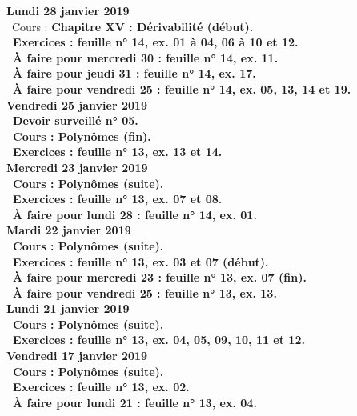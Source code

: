 \documentclass[12pt,a4paper]{article}
\begin{document}
\noindent\textbf{Lundi 28 janvier 2019} \\
\bu\ Cours : \bf Chapitre XV \rm : Dérivabilité (début).\\
\bu\ Exercices : feuille n° 14, ex. 01 à 04, 06 à 10 et 12.\\
\bu\ À faire pour mercredi 30 : feuille n° 14, ex. 11.\\
\bu\ À faire pour jeudi 31 : feuille n° 14, ex. 17.\\
\bu\ À faire pour vendredi 25 : feuille n° 14, ex. 05, 13, 14 et 19.\vspace{.4cm}\\
 
\noindent\textbf{Vendredi 25 janvier 2019}\\
\bu\ Devoir surveillé n° 05.\\
\bu\ Cours : Polynômes (fin).\\
\bu\ Exercices : feuille n° 13, ex. 13 et 14.\vspace{.4cm}\\

\noindent\textbf{Mercredi 23 janvier 2019} \\
\bu\ Cours : Polynômes (suite).\\
\bu\ Exercices : feuille n° 13, ex. 07 et 08.\\
\bu\ À faire pour lundi 28 : feuille n° 14, ex. 01.\vspace{.4cm}\\
 
\noindent\textbf{Mardi 22 janvier 2019} \\
\bu\ Cours : Polynômes (suite).\\
\bu\ Exercices : feuille n° 13, ex. 03 et 07 (début).\\
\bu\ À faire pour mercredi 23 : feuille n° 13, ex. 07 (fin).\\
\bu\ À faire pour vendredi 25 : feuille n° 13, ex. 13.\vspace{.4cm}\\

\noindent\textbf{Lundi 21 janvier 2019} \\
\bu\ Cours : Polynômes (suite).\\
\bu\ Exercices : feuille n° 13, ex. 04, 05, 09, 10, 11 et 12.\vspace{.4cm}\\

\noindent\textbf{Vendredi 17 janvier 2019}\\
\bu\ Cours : Polynômes (suite).\\
\bu\ Exercices : feuille n° 13, ex. 02.\\
\bu\ À faire pour lundi 21 : feuille n° 13, ex. 04.\vspace{.4cm}\\
\end{document}
